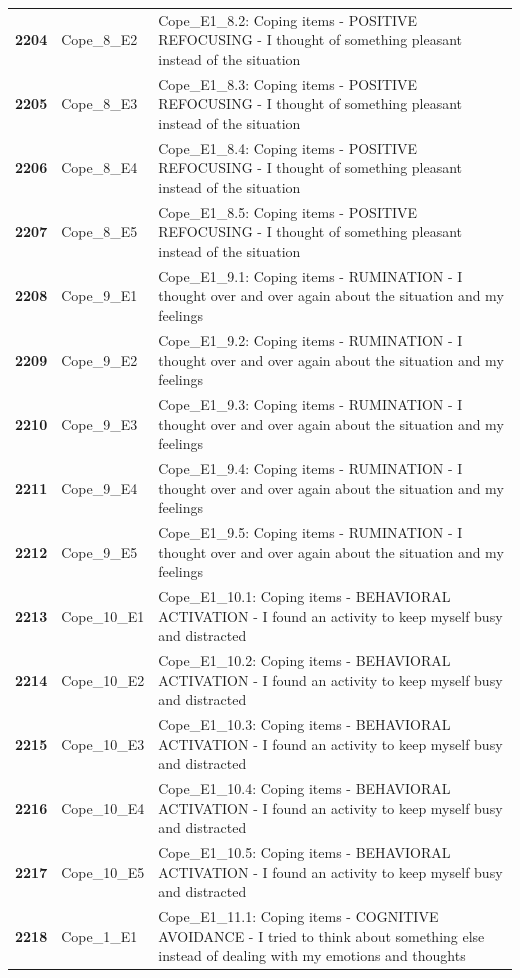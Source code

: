 \documentclass[
  letterpaper,
  DIV=11,
  numbers=noendperiod]{scrartcl}
\begin{document}
\begin{longtable}[t]{>{}cll}
\textbf{2204} & Cope\_8\_E2 & Cope\_E1\_8.2: Coping items - POSITIVE REFOCUSING - I thought of something pleasant instead of the situation\\
\textbf{2205} & Cope\_8\_E3 & Cope\_E1\_8.3: Coping items - POSITIVE REFOCUSING - I thought of something pleasant instead of the situation\\
\addlinespace
\textbf{2206} & Cope\_8\_E4 & Cope\_E1\_8.4: Coping items - POSITIVE REFOCUSING - I thought of something pleasant instead of the situation\\
\textbf{2207} & Cope\_8\_E5 & Cope\_E1\_8.5: Coping items - POSITIVE REFOCUSING - I thought of something pleasant instead of the situation\\
\textbf{2208} & Cope\_9\_E1 & Cope\_E1\_9.1: Coping items - RUMINATION - I thought over and over again about the situation and my feelings\\
\textbf{2209} & Cope\_9\_E2 & Cope\_E1\_9.2: Coping items - RUMINATION - I thought over and over again about the situation and my feelings\\
\textbf{2210} & Cope\_9\_E3 & Cope\_E1\_9.3: Coping items - RUMINATION - I thought over and over again about the situation and my feelings\\
\addlinespace
\textbf{2211} & Cope\_9\_E4 & Cope\_E1\_9.4: Coping items - RUMINATION - I thought over and over again about the situation and my feelings\\
\textbf{2212} & Cope\_9\_E5 & Cope\_E1\_9.5: Coping items - RUMINATION - I thought over and over again about the situation and my feelings\\
\textbf{2213} & Cope\_10\_E1 & Cope\_E1\_10.1: Coping items - BEHAVIORAL ACTIVATION - I found an activity to keep myself busy and distracted\\
\textbf{2214} & Cope\_10\_E2 & Cope\_E1\_10.2: Coping items - BEHAVIORAL ACTIVATION - I found an activity to keep myself busy and distracted\\
\textbf{2215} & Cope\_10\_E3 & Cope\_E1\_10.3: Coping items - BEHAVIORAL ACTIVATION - I found an activity to keep myself busy and distracted\\
\addlinespace
\textbf{2216} & Cope\_10\_E4 & Cope\_E1\_10.4: Coping items - BEHAVIORAL ACTIVATION - I found an activity to keep myself busy and distracted\\
\textbf{2217} & Cope\_10\_E5 & Cope\_E1\_10.5: Coping items - BEHAVIORAL ACTIVATION - I found an activity to keep myself busy and distracted\\
\textbf{2218} & Cope\_1\_E1 & Cope\_E1\_11.1: Coping items - COGNITIVE AVOIDANCE - I tried to think about something else instead of dealing with my emotions and thoughts\\

\end{longtable}
\end{document}
